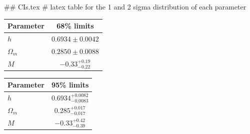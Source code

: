 ## CIs.tex
# latex table for the 1 and 2 sigma distribution of each parameter

\begin{tabular} { l  c}
 Parameter &  68\% limits\\
\hline
{\boldmath$h              $} & $0.6934\pm 0.0042          $\\
{\boldmath$\Omega_m       $} & $0.2850\pm 0.0088          $\\
{\boldmath$M              $} & $-0.33^{+0.19}_{-0.22}     $\\
\hline
\end{tabular}

\begin{tabular} { l  c}
 Parameter &  95\% limits\\
\hline
{\boldmath$h              $} & $0.6934^{+0.0082}_{-0.0083}$\\
{\boldmath$\Omega_m       $} & $0.285^{+0.017}_{-0.017}   $\\
{\boldmath$M              $} & $-0.33^{+0.42}_{-0.39}     $\\
\hline
\end{tabular}
